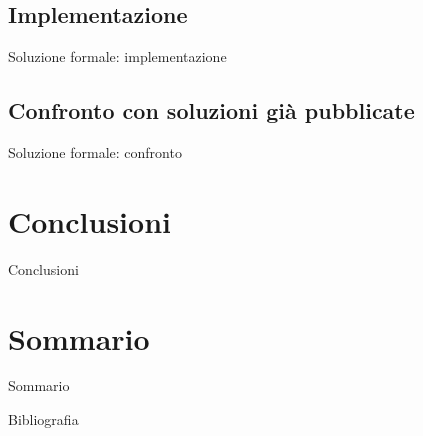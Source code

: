 \documentclass{beamer}
\begin{document}
\subsection{Implementazione}
\begin{frame}{Soluzione formale: implementazione}

\end{frame}

\subsection{Confronto con soluzioni già pubblicate}
\begin{frame}{Soluzione formale: confronto}

\end{frame}

\section{Conclusioni}
\begin{frame}{Conclusioni}

\end{frame}

\section{Sommario}
\begin{frame}{Sommario}

\end{frame}

\begin{frame}{Bibliografia}
	\printbibliography
\end{frame}
\end{document}
